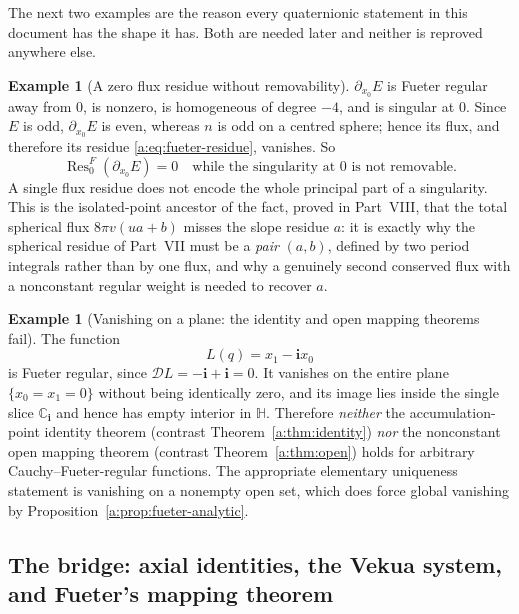 \documentclass[11pt,a4paper]{article}
\numberwithin{equation}{section}
\theoremstyle{definition}
\newtheorem{example}[theorem]{Example}
\theoremstyle{remark}
\theoremstyle{plain}
\newcommand{\HH}{\mathbb H}
\newcommand{\CC}{\mathbb C}
\newcommand{\Dop}{\mathcal D}
\newcommand{\Res}{\operatorname{Res}}
\begin{document}
The next two examples are the reason every quaternionic statement in this
document has the shape it has. Both are needed later and neither is reproved
anywhere else.

\begin{example}[A zero flux residue without removability]
\label{a:ex:dxE}
$\partial_{x_0}E$ is Fueter regular away from $0$, is nonzero, is homogeneous
of degree $-4$, and is singular at $0$. Since $E$ is odd, $\partial_{x_0}E$ is
even, whereas $n$ is odd on a centred sphere; hence its flux, and therefore
its residue \eqref{a:eq:fueter-residue}, vanishes. So
\[
 \Res^F_0(\partial_{x_0}E)=0
 \quad\text{while the singularity at }0\text{ is not removable.}
\]
A single flux residue does not encode the whole principal part of a
singularity. This is the isolated-point ancestor of the fact, proved in
Part~VIII, that the total spherical flux $8\pi v(ua+b)$ misses the slope
residue $a$: it is exactly why the spherical residue of Part~VII must be a
\emph{pair} $(a,b)$, defined by two period integrals rather than by one flux,
and why a genuinely second conserved flux with a nonconstant regular weight is
needed to recover $a$.
\end{example}

\begin{example}[Vanishing on a plane: the identity and open mapping theorems fail]
\label{a:ex:fueter-plane}
The function
\begin{equation}
 L(q)=x_1-\mathbf ix_0
 \label{a:eq:fueter-plane}
\end{equation}
is Fueter regular, since $\Dop L=-\mathbf i+\mathbf i=0$. It vanishes on the
entire plane $\{x_0=x_1=0\}$ without being identically zero, and its image
lies inside the single slice $\CC_{\mathbf i}$ and hence has empty interior in
$\HH$. Therefore \emph{neither} the accumulation-point identity theorem
(contrast Theorem~\ref{a:thm:identity}) \emph{nor} the nonconstant open
mapping theorem (contrast Theorem~\ref{a:thm:open}) holds for arbitrary
Cauchy--Fueter-regular functions. The appropriate elementary uniqueness
statement is vanishing on a nonempty open set, which does force global
vanishing by Proposition~\ref{a:prop:fueter-analytic}.
\end{example}

\subsection{The bridge: axial identities, the Vekua system, and Fueter's
mapping theorem}
\label{a:sec:bridge}
\end{document}
